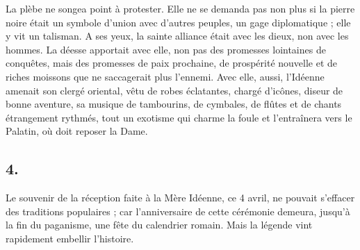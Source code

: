 \documentclass[a4paper, 11pt, oneside, polutonikogreek, french]{article}
\begin{document}
La plèbe ne songea point à protester. Elle ne se demanda pas non plus si la pierre noire était un symbole d'union avec d'autres peuples, un gage diplomatique ; elle y vit un talisman. A ses yeux, la sainte alliance était avec les dieux, non avec les hommes. La déesse apportait avec elle, non pas des promesses lointaines de conquêtes, mais des promesses de paix prochaine, de prospérité nouvelle et de riches moissons que ne saccagerait plus l'ennemi. Avec elle, aussi, l'Idéenne amenait son clergé oriental, vêtu de robes éclatantes, chargé d'icônes, diseur de bonne aventure, sa musique de tambourins, de cymbales, de flûtes et de chants étrangement rythmés, tout un exotisme qui charme la foule et l'entraînera vers le Palatin, où doit reposer la Dame.

\subsection{4.}

Le souvenir de la réception faite à la Mère Idéenne, ce 4 avril, ne pouvait s'effacer des traditions populaires ; car l'anniversaire de cette cérémonie demeura, jusqu'à la fin du paganisme, une fête du calendrier romain. Mais la légende vint rapidement embellir l'histoire. 
\end{document}
